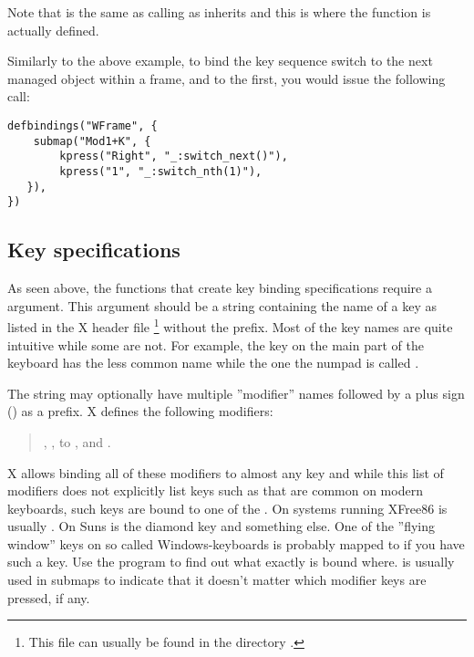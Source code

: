 Note that  is the same as calling
 as  inherits
 and this is where the function is actually defined.

Similarly to the above example, to bind the key sequence  
switch to the next managed object within a frame, and  to the
first, you would issue the following call:
\begin{verbatim}
defbindings("WFrame", {
    submap("Mod1+K", {
        kpress("Right", "_:switch_next()"),
        kpress("1", "_:switch_nth(1)"),
   }),
})
\end{verbatim}


\subsection{Key specifications}

As seen above, the functions that create key binding specifications require
a  argument. This argument should be a string containing the
name of a key as listed in the X header file %
\footnote{This file can usually be found in the directory
.} without the  prefix.
Most of the key names are quite intuitive while some are not. For example,
the  key on the main part of the keyboard has the less common
name  while the one the numpad is called .

The  string may optionally have multiple ''modifier'' names
followed by a plus sign (\code{+}) as a prefix. X defines the following
modifiers:
\begin{quotation}
, ,  to ,
 and .
\end{quotation}

X allows binding all of these modifiers to almost any key and while this
list of modifiers does not explicitly list keys such as 
 that are common on modern keyboards, such
keys are bound to one of the . On systems running XFree86
 is usually . On Suns  is the diamond key
and  something else. One of the ''flying window'' keys on so
called Windows-keyboards is probably mapped to  if you have
such a key. Use the program 
to find out what exactly is bound where.  is usually
used in submaps to indicate that it doesn't matter which modifier keys
are pressed, if any.

